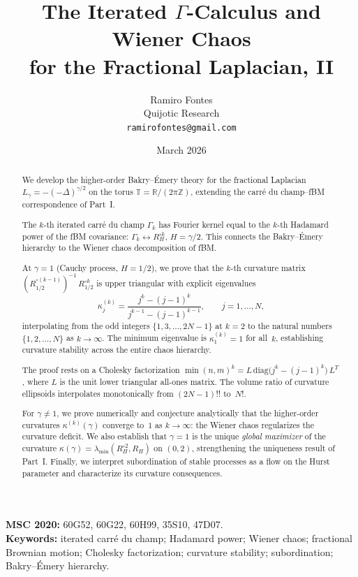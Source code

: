 \documentclass[11pt,a4paper]{article}
\title{The Iterated $\Gamma$-Calculus and Wiener Chaos\\
for the Fractional Laplacian, II}
\author{Ramiro Fontes\\
Quijotic Research\\
\texttt{ramirofontes@gmail.com}}
\date{March 2026}
\theoremstyle{plain}
\theoremstyle{definition}
\theoremstyle{remark}
\newcommand{\R}{\mathbb{R}}
\newcommand{\Z}{\mathbb{Z}}
\newcommand{\T}{\mathbb{T}}
\begin{document}
\maketitle

\begin{abstract}
We develop the higher-order Bakry--\'Emery theory for the
fractional Laplacian $L_\gamma = -(-\Delta)^{\gamma/2}$ on the
torus $\T = \R/(2\pi\Z)$, extending the carré du champ--fBM
correspondence of Part~I.

The $k$-th iterated carr\'e du champ
$\Gamma_k$ has Fourier kernel equal to the $k$-th Hadamard power
of the fBM covariance: $\Gamma_k \leftrightarrow R_H^{\circ k}$,
$H = \gamma/2$. This connects the Bakry--\'Emery hierarchy to the
Wiener chaos decomposition of fBM.

At $\gamma = 1$ (Cauchy process, $H = 1/2$), we prove
that the $k$-th curvature matrix
$(R_{1/2}^{\circ(k-1)})^{-1}\,R_{1/2}^{\circ k}$
is upper triangular with explicit eigenvalues
\[
  \kappa_j^{(k)}
  = \frac{j^k - (j-1)^k}{j^{k-1} - (j-1)^{k-1}},
  \qquad j = 1,\ldots,N,
\]
interpolating from the odd integers $\{1,3,\ldots,2N{-}1\}$ at
$k = 2$ to the natural numbers $\{1,2,\ldots,N\}$ as
$k \to \infty$.
The minimum eigenvalue is $\kappa_1^{(k)} = 1$ for all~$k$,
establishing curvature stability across the entire chaos hierarchy.

The proof rests on a Cholesky factorization
$\min(n,m)^k = L\,\mathrm{diag}\bigl(j^k - (j{-}1)^k\bigr)\,L^T$,
where $L$ is the unit lower triangular all-ones matrix.
The volume ratio of curvature ellipsoids interpolates
monotonically from $(2N{-}1)!!$ to~$N!$.

For $\gamma \neq 1$, we prove numerically and conjecture
analytically that the higher-order curvatures
$\kappa^{(k)}(\gamma)$ converge to~$1$ as $k \to \infty$:
the Wiener chaos regularizes the curvature deficit.
We also establish that $\gamma = 1$ is the unique
\emph{global maximizer} of the curvature
$\kappa(\gamma) = \lambda_{\min}(R_H^{\circ 2}, R_H)$
on $(0,2)$, strengthening the uniqueness result of Part~I.
Finally, we interpret subordination of stable processes as a flow on
the Hurst parameter and characterize its curvature consequences.
\end{abstract}

\medskip
\noindent\textbf{MSC 2020:} 60G52, 60G22, 60H99, 35S10, 47D07.\\
\textbf{Keywords:} iterated carr\'e du champ; Hadamard power;
Wiener chaos; fractional Brownian motion; Cholesky factorization;
curvature stability; subordination; Bakry--\'Emery hierarchy.
\end{document}
